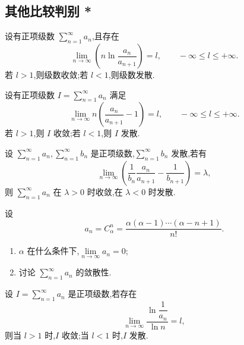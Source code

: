 \documentclass[../数学分析培优讲义.tex]{subfiles}
\begin{document}
\newpage

\subsection{其他比较判别 *}

\begin{example}[比值对数判别法]
设有正项级数 $\displaystyle\sum\limits_{n=1}^{\infty}a_n$,且存在
\[
    \lim\limits_{n\to\infty}\left(n\ln\dfrac{a_n}{a_{n+1}}\right)=l,
    \qquad -\infty\leq l\leq+\infty.
\]
若 $l>1$,则级数收敛;若 $l<1$,则级数发散.
\end{example}
\exampleblank

\begin{example}
设有正项级数 $\displaystyle I=\sum\limits_{n=1}^{\infty}a_n$ 满足
\[
    \lim\limits_{n\to\infty}n\left(\dfrac{a_n}{a_{n+1}}-1\right)=l,
    \qquad -\infty\leq l\leq+\infty.
\]
若 $l>1$,则 $I$ 收敛;若 $l<1$,则 $I$ 发散.
\end{example}
\exampleblank

\begin{example}
设 $\displaystyle\sum\limits_{n=1}^{\infty}a_n,\sum\limits_{n=1}^{\infty}b_n$ 是正项级数,$\displaystyle\sum\limits_{n=1}^{\infty}b_n$ 发散,若有
\[
    \lim\limits_{n\to\infty}\left(\dfrac{1}{b_n}\dfrac{a_n}{a_{n+1}}-\dfrac{1}{b_{n+1}}\right)=\lambda,
\]
则 $\displaystyle\sum\limits_{n=1}^{\infty}a_n$ 在 $\lambda>0$ 时收敛,在 $\lambda<0$ 时发散.
\end{example}
\exampleblank

\begin{example}
设
\[
    a_n=C_{\alpha}^{n}=\dfrac{\alpha(\alpha-1)\cdots(\alpha-n+1)}{n!}.
\]
\begin{enumerate}[label=(\arabic*)]
    \item $\alpha$ 在什么条件下,$\displaystyle\lim\limits_{n\to\infty}a_n=0$;
    \item 讨论 $\displaystyle\sum\limits_{n=1}^{\infty}a_n$ 的敛散性.
\end{enumerate}
\end{example}
\exampleblank

\begin{example}[对数判别法]
设 $\displaystyle I=\sum\limits_{n=1}^{\infty}a_n$ 是正项级数,若存在
\[
    \lim\limits_{n\to\infty}\dfrac{\ln\dfrac{1}{a_n}}{\ln n}=l,
\]
则当 $l>1$ 时,$I$ 收敛;当 $l<1$ 时,$I$ 发散.
\end{example}
\exampleblank


\newpage
\end{document}
